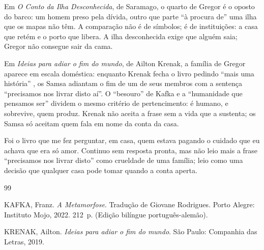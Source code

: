 \documentclass[12pt]{article}
\begin{document}
Em \emph{O Conto da Ilha Desconhecida}, de Saramago, o quarto de Gregor é o oposto do barco: um homem preso pela dívida, outro que parte ``à procura de'' uma ilha que os mapas não têm. A comparação não é de símbolos; é de instituições: a casa que retém e o porto que libera. A ilha desconhecida exige que alguém saia; Gregor não consegue sair da cama.

Em \emph{Ideias para adiar o fim do mundo}, de Ailton Krenak, a família de Gregor aparece em escala doméstica: enquanto Krenak fecha o livro pedindo ``mais uma história'' \cite[p. 27]{krenak2019}, os Samsa adiantam o fim de um de seus membros com a sentença ``precisamos nos livrar disto aí''. O ``besouro'' de Kafka e a ``humanidade que pensamos ser'' \cite[p. 13]{krenak2019} dividem o mesmo critério de pertencimento: é humano, e sobrevive, quem produz. Krenak não aceita a frase sem a vida que a sustenta; os Samsa só aceitam quem fala em nome da conta da casa.

Foi o livro que me fez perguntar, em casa, quem estava pagando o cuidado que eu achava que era só amor. Continuo sem resposta pronta, mas não leio mais a frase ``precisamos nos livrar disto'' como crueldade de uma família; leio como uma decisão que qualquer casa pode tomar quando a conta aperta.

\begin{thebibliography}{99}

KAFKA, Franz. \emph{A Metamorfose}. Tradução de Giovane Rodrigues. Porto Alegre: Instituto Mojo, 2022. 212~p. (Edição bilíngue português-alemão).

KRENAK, Ailton. \emph{Ideias para adiar o fim do mundo}. São Paulo: Companhia das Letras, 2019.

\end{thebibliography}
\end{document}
